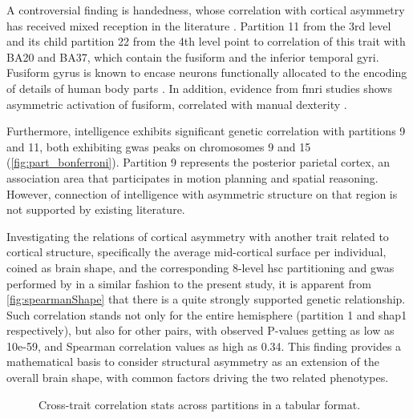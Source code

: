 A controversial finding is handedness, whose correlation with cortical asymmetry has received mixed reception in the literature \cite{Sun2006}. Partition 11 from the 3rd level and its child partition 22 from the 4th level point to correlation of this trait with BA20 and BA37, which contain the fusiform and the inferior temporal gyri. Fusiform gyrus is known to encase neurons functionally allocated to the encoding of details of human body parts \cite{Peelen2005}. In addition, evidence from f\ac{mri} studies shows asymmetric activation of fusiform, correlated with manual dexterity \cite{Bracci2010}. 

Furthermore, intelligence exhibits significant genetic correlation with partitions 9 and 11, both exhibiting \ac{gwas} peaks on chromosomes 9 and 15 (\autoref{fig:part_bonferroni}). Partition 9 represents the posterior parietal cortex, an association area that participates in motion planning and spatial reasoning. However, connection of intelligence with asymmetric structure on that region is not supported by existing literature.

Investigating the relations of cortical asymmetry with another trait related to cortical structure, specifically the average mid-cortical surface per individual, coined as brain shape, and the corresponding 8-level \ac{hsc} partitioning and \ac{gwas} performed by \citet{Naqvi2021} in a similar fashion to the present study, it is apparent from \autoref{fig:spearmanShape} that there is a quite strongly supported genetic relationship. Such correlation stands not only for the entire hemisphere (partition 1 and shap1 respectively), but also for other pairs, with observed P-values getting as low as 10e-59, and Spearman correlation values as high as 0.34. This finding provides a mathematical basis to consider structural asymmetry as an extension of the overall brain shape, with common factors driving the two related phenotypes.


\begin{figure}[H]

	\caption{Cross-trait correlation stats across partitions in a tabular format.}
	\label{fig:spearmanOtherTraits}
	
\end{figure}

